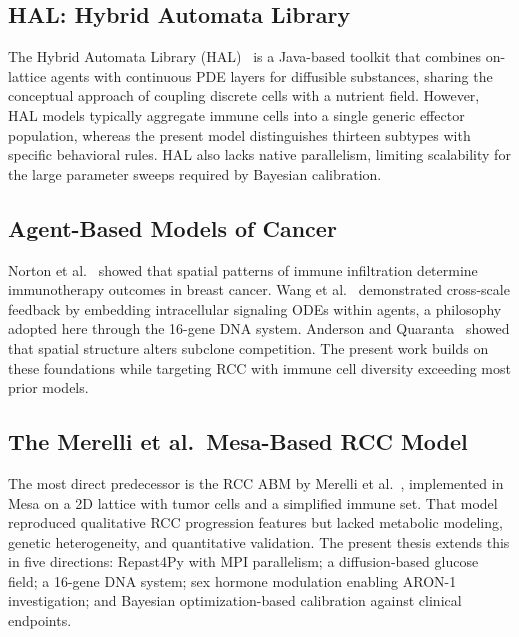 \subsection{HAL: Hybrid Automata Library}
\label{subsec:rw_hal}

The Hybrid Automata Library (HAL)~\cite{bravo2013} is a Java-based toolkit that combines on-lattice agents with continuous PDE layers for diffusible substances, sharing the conceptual approach of coupling discrete cells with a nutrient field. However, HAL models typically aggregate immune cells into a single generic effector population, whereas the present model distinguishes thirteen subtypes with specific behavioral rules. HAL also lacks native parallelism, limiting scalability for the large parameter sweeps required by Bayesian calibration.

\subsection{Agent-Based Models of Cancer}
\label{subsec:rw_cancer_abms}

Norton et al.~\cite{norton2019} showed that spatial patterns of immune infiltration determine immunotherapy outcomes in breast cancer.  Wang et al.~\cite{wang2015} demonstrated cross-scale feedback by embedding intracellular signaling ODEs within agents, a philosophy adopted here through the 16-gene DNA system.  Anderson and Quaranta~\cite{anderson2008} showed that spatial structure alters subclone competition.  The present work builds on these foundations while targeting RCC with immune cell diversity exceeding most prior models.

\subsection{The Merelli et al.\ Mesa-Based RCC Model}
\label{subsec:rw_merelli}

The most direct predecessor is the RCC ABM by Merelli et al.~\cite{merelli2021}, implemented in Mesa on a 2D lattice with tumor cells and a simplified immune set.  That model reproduced qualitative RCC progression features but lacked metabolic modeling, genetic heterogeneity, and quantitative validation.  The present thesis extends this in five directions: Repast4Py with MPI parallelism; a diffusion-based glucose field; a 16-gene DNA system; sex hormone modulation enabling ARON-1 investigation; and Bayesian optimization-based calibration against clinical endpoints.

